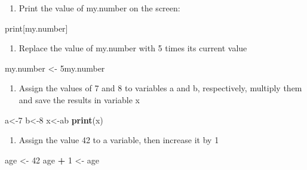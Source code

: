 \documentclass[
]{book}
\newenvironment{Shaded}{\begin{snugshade}}{\end{snugshade}}
\newcommand{\DecValTok}[1]{\textcolor[rgb]{0.00,0.00,0.81}{#1}}
\newcommand{\KeywordTok}[1]{\textcolor[rgb]{0.13,0.29,0.53}{\textbf{#1}}}
\newcommand{\NormalTok}[1]{#1}
\newcommand{\OperatorTok}[1]{\textcolor[rgb]{0.81,0.36,0.00}{\textbf{#1}}}
\newcommand{\StringTok}[1]{\textcolor[rgb]{0.31,0.60,0.02}{#1}}
\providecommand{\tightlist}{%
  \setlength{\itemsep}{0pt}\setlength{\parskip}{0pt}}
\begin{document}
\begin{enumerate}
\def\labelenumi{\arabic{enumi}.}
\setcounter{enumi}{4}
\tightlist
\item
  Print the value of my.number on the screen:
\end{enumerate}

\begin{Shaded}
\begin{Highlighting}[]
\NormalTok{print[my.number]}
\end{Highlighting}
\end{Shaded}

\begin{enumerate}
\def\labelenumi{\arabic{enumi}.}
\setcounter{enumi}{5}
\tightlist
\item
  Replace the value of my.number with 5 times its current value
\end{enumerate}

\begin{Shaded}
\begin{Highlighting}[]
\NormalTok{my.number \textless{}{-}}\StringTok{ }\NormalTok{5my.number }
\end{Highlighting}
\end{Shaded}

\begin{enumerate}
\def\labelenumi{\arabic{enumi}.}
\setcounter{enumi}{6}
\tightlist
\item
  Assign the values of 7 and 8 to variables a and b, respectively, multiply them and save the results in variable x
\end{enumerate}

\begin{Shaded}
\begin{Highlighting}[]
\NormalTok{a\textless{}{-}}\DecValTok{7}
\NormalTok{b\textless{}{-}}\DecValTok{8}
\NormalTok{x\textless{}{-}ab}
\KeywordTok{print}\NormalTok{(x)}
\end{Highlighting}
\end{Shaded}

\begin{enumerate}
\def\labelenumi{\arabic{enumi}.}
\setcounter{enumi}{8}
\tightlist
\item
  Assign the value 42 to a variable, then increase it by 1
\end{enumerate}

\begin{Shaded}
\begin{Highlighting}[]
\NormalTok{age \textless{}{-}}\StringTok{ }\DecValTok{42}
\NormalTok{age }\OperatorTok{+}\StringTok{ }\DecValTok{1}\NormalTok{ \textless{}{-}}\StringTok{ }\NormalTok{age}
\end{Highlighting}
\end{Shaded}
\end{document}
